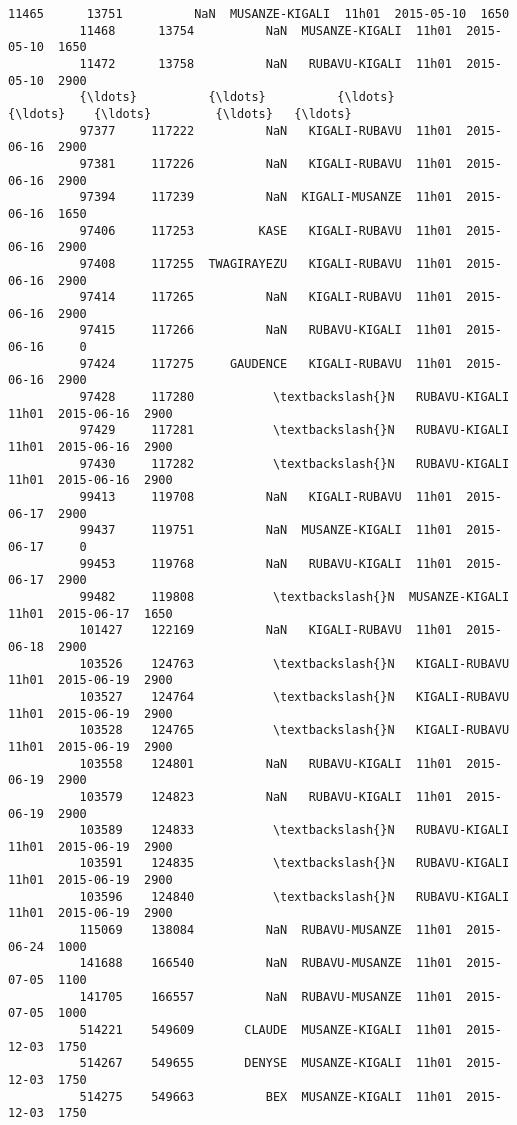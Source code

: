 \documentclass[11pt]{article}
\begin{document}
\begin{Verbatim}[commandchars=\\\{\}]
          11465      13751          NaN  MUSANZE-KIGALI  11h01  2015-05-10  1650   
          11468      13754          NaN  MUSANZE-KIGALI  11h01  2015-05-10  1650   
          11472      13758          NaN   RUBAVU-KIGALI  11h01  2015-05-10  2900   
          {\ldots}          {\ldots}          {\ldots}             {\ldots}    {\ldots}         {\ldots}   {\ldots}   
          97377     117222          NaN   KIGALI-RUBAVU  11h01  2015-06-16  2900   
          97381     117226          NaN   KIGALI-RUBAVU  11h01  2015-06-16  2900   
          97394     117239          NaN  KIGALI-MUSANZE  11h01  2015-06-16  1650   
          97406     117253         KASE   KIGALI-RUBAVU  11h01  2015-06-16  2900   
          97408     117255  TWAGIRAYEZU   KIGALI-RUBAVU  11h01  2015-06-16  2900   
          97414     117265          NaN   KIGALI-RUBAVU  11h01  2015-06-16  2900   
          97415     117266          NaN   RUBAVU-KIGALI  11h01  2015-06-16     0   
          97424     117275     GAUDENCE   KIGALI-RUBAVU  11h01  2015-06-16  2900   
          97428     117280           \textbackslash{}N   RUBAVU-KIGALI  11h01  2015-06-16  2900   
          97429     117281           \textbackslash{}N   RUBAVU-KIGALI  11h01  2015-06-16  2900   
          97430     117282           \textbackslash{}N   RUBAVU-KIGALI  11h01  2015-06-16  2900   
          99413     119708          NaN   KIGALI-RUBAVU  11h01  2015-06-17  2900   
          99437     119751          NaN  MUSANZE-KIGALI  11h01  2015-06-17     0   
          99453     119768          NaN   RUBAVU-KIGALI  11h01  2015-06-17  2900   
          99482     119808           \textbackslash{}N  MUSANZE-KIGALI  11h01  2015-06-17  1650   
          101427    122169          NaN   KIGALI-RUBAVU  11h01  2015-06-18  2900   
          103526    124763           \textbackslash{}N   KIGALI-RUBAVU  11h01  2015-06-19  2900   
          103527    124764           \textbackslash{}N   KIGALI-RUBAVU  11h01  2015-06-19  2900   
          103528    124765           \textbackslash{}N   KIGALI-RUBAVU  11h01  2015-06-19  2900   
          103558    124801          NaN   RUBAVU-KIGALI  11h01  2015-06-19  2900   
          103579    124823          NaN   RUBAVU-KIGALI  11h01  2015-06-19  2900   
          103589    124833           \textbackslash{}N   RUBAVU-KIGALI  11h01  2015-06-19  2900   
          103591    124835           \textbackslash{}N   RUBAVU-KIGALI  11h01  2015-06-19  2900   
          103596    124840           \textbackslash{}N   RUBAVU-KIGALI  11h01  2015-06-19  2900   
          115069    138084          NaN  RUBAVU-MUSANZE  11h01  2015-06-24  1000   
          141688    166540          NaN  RUBAVU-MUSANZE  11h01  2015-07-05  1100   
          141705    166557          NaN  RUBAVU-MUSANZE  11h01  2015-07-05  1000   
          514221    549609       CLAUDE  MUSANZE-KIGALI  11h01  2015-12-03  1750   
          514267    549655       DENYSE  MUSANZE-KIGALI  11h01  2015-12-03  1750   
          514275    549663          BEX  MUSANZE-KIGALI  11h01  2015-12-03  1750   
          

\end{Verbatim}
\end{document}
